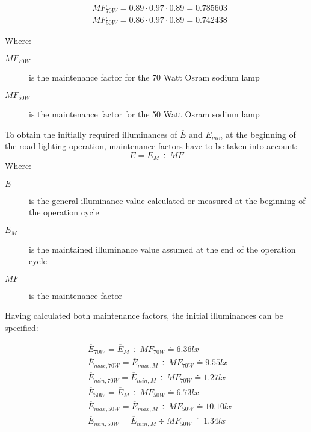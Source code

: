 \begin{align}
&MF_{70W} = 0.89 \cdot 0.97 \cdot 0.89 = 0.785603\\
&MF_{50W} = 0.86 \cdot 0.97 \cdot 0.89 = 0.742438
\end{align}

Where:
\begin{description}
	\item[$MF_{70W}$] is the maintenance factor for the 70 Watt Osram sodium lamp
	\item[$MF_{50W}$] is the maintenance factor for the 50 Watt Osram sodium lamp
\end{description}

To obtain the initially required illuminances of $\overline{E}$ and $E_{min}$ at the beginning of the road lighting operation, maintenance factors have to be taken into account:
\begin{equation}
E = E_{M} \div MF
\end{equation}
Where:
\begin{description}
	\item[$E$] is the general illuminance value calculated or measured at the beginning of the operation cycle
	\item[$E_{M}$] is the maintained illuminance value assumed at the end of the operation cycle
	\item[$MF$] is the maintenance factor
\end{description}

Having calculated both maintenance factors, the initial illuminances can be specified:

\begin{align}
&\overline{E}_{70W} = \overline{E}_{M} \div MF_{70W} \doteq 6.36 lx\\
&\overline{E}_{max,70W} = \overline{E}_{max,M} \div MF_{70W} \doteq 9.55 lx\\
&\overline{E}_{min,70W} = \overline{E}_{min,M} \div MF_{70W} \doteq 1.27 lx\\
&\overline{E}_{50W} = \overline{E}_{M} \div MF_{50W} \doteq 6.73 lx\\
&\overline{E}_{max,50W} = \overline{E}_{max,M} \div MF_{50W} \doteq 10.10 lx\\
&\overline{E}_{min,50W} = \overline{E}_{min,M} \div MF_{50W} \doteq 1.34 lx
\end{align}